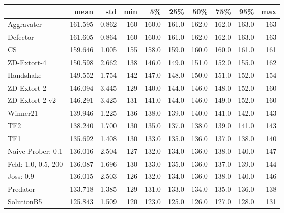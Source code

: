 \begin{tabular}{lrrrrrrrrr}
\toprule
{} &     mean &    std &  min &     5\% &    25\% &    50\% &    75\% &    95\% &  max \\
\midrule
Aggravater          &  161.595 &  0.862 &  160 &  160.0 &  161.0 &  162.0 &  162.0 &  163.0 &  163 \\
Defector            &  161.605 &  0.864 &  160 &  160.0 &  161.0 &  162.0 &  162.0 &  163.0 &  163 \\
CS                  &  159.646 &  1.005 &  155 &  158.0 &  159.0 &  160.0 &  160.0 &  161.0 &  161 \\
ZD-Extort-4         &  150.598 &  2.662 &  138 &  146.0 &  149.0 &  151.0 &  152.0 &  155.0 &  162 \\
Handshake           &  149.552 &  1.754 &  142 &  147.0 &  148.0 &  150.0 &  151.0 &  152.0 &  154 \\
ZD-Extort-2         &  146.094 &  3.445 &  129 &  140.0 &  144.0 &  146.0 &  148.0 &  152.0 &  160 \\
ZD-Extort-2 v2      &  146.291 &  3.425 &  131 &  141.0 &  144.0 &  146.0 &  149.0 &  152.0 &  160 \\
Winner21            &  139.946 &  1.225 &  136 &  138.0 &  139.0 &  140.0 &  141.0 &  142.0 &  143 \\
TF2                 &  138.240 &  1.700 &  130 &  135.0 &  137.0 &  138.0 &  139.0 &  141.0 &  143 \\
TF1                 &  135.692 &  1.408 &  130 &  133.0 &  135.0 &  136.0 &  137.0 &  138.0 &  140 \\
Naive Prober: 0.1   &  136.016 &  2.504 &  127 &  132.0 &  134.0 &  136.0 &  138.0 &  140.0 &  147 \\
Feld: 1.0, 0.5, 200 &  136.087 &  1.696 &  130 &  133.0 &  135.0 &  136.0 &  137.0 &  139.0 &  144 \\
Joss: 0.9           &  136.015 &  2.503 &  126 &  132.0 &  134.0 &  136.0 &  138.0 &  140.0 &  146 \\
Predator            &  133.718 &  1.385 &  129 &  131.0 &  133.0 &  134.0 &  135.0 &  136.0 &  138 \\
SolutionB5          &  125.843 &  1.509 &  120 &  123.0 &  125.0 &  126.0 &  127.0 &  128.0 &  131 \\
\bottomrule
\end{tabular}
